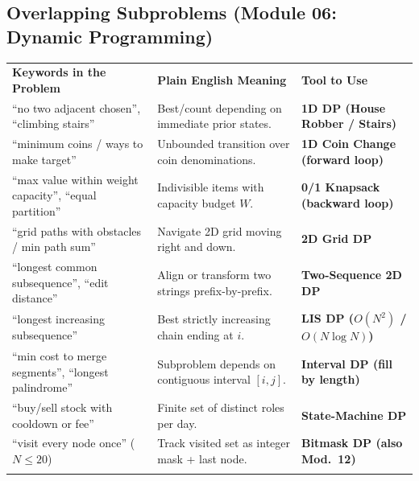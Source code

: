\documentclass[11pt,a4paper]{article}
\begin{document}
\subsection{Overlapping Subproblems (Module 06: Dynamic Programming)}
\begingroup\footnotesize{}
\begin{tabularx}{\textwidth}{>{\raggedright\arraybackslash}p{4.4cm} >{\raggedright\arraybackslash}X >{\raggedright\arraybackslash\bfseries}p{4.0cm}}
\arrayrulecolor{primaryblue}\toprule[1.1pt]
\rowcolor{primaryblue!10}
\textcolor{primaryblue}{\textbf{Keywords in the Problem}} & \textcolor{primaryblue}{\textbf{Plain English Meaning}} & \textcolor{primaryblue}{\textbf{Tool to Use}} \\
\arrayrulecolor{codeframe}\midrule[0.6pt]
``no two adjacent chosen'', ``climbing stairs'' & Best/count depending on immediate prior states. & 1D DP (House Robber / Stairs) \\
``minimum coins / ways to make target'' & Unbounded transition over coin denominations. & 1D Coin Change (forward loop) \\
``max value within weight capacity'', ``equal partition'' & Indivisible items with capacity budget $W$. & 0/1 Knapsack (backward loop) \\
``grid paths with obstacles / min path sum'' & Navigate 2D grid moving right and down. & 2D Grid DP \\
``longest common subsequence'', ``edit distance'' & Align or transform two strings prefix-by-prefix. & Two-Sequence 2D DP \\
``longest increasing subsequence'' & Best strictly increasing chain ending at $i$. & LIS DP ($O(N^2)$ / $O(N \log N)$) \\
``min cost to merge segments'', ``longest palindrome'' & Subproblem depends on contiguous interval $[i, j]$. & Interval DP (fill by length) \\
``buy/sell stock with cooldown or fee'' & Finite set of distinct roles per day. & State-Machine DP \\
``visit every node once'' ($N \le 20$) & Track visited set as integer mask + last node. & Bitmask DP (also Mod.\ 12) \\
\arrayrulecolor{primaryblue}\bottomrule[1.1pt]
\end{tabularx}\endgroup
\end{document}
